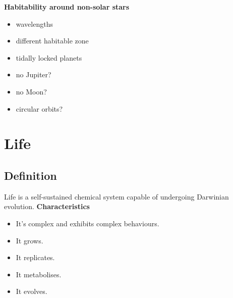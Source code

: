 \documentclass{article}
\theoremstyle{sltheorem}
\begin{document}
\textbf{Habitability around non-solar stars}
\begin{itemize}
	\item wavelengths
	\item different habitable zone
	\item tidally locked planets
	\item no Jupiter?
	\item no Moon?
	\item circular orbits?
\end{itemize}
\section{Life}
\subsection{Definition}
Life is a self-sustained chemical system capable of undergoing Darwinian evolution.
\textbf{Characteristics}
\begin{itemize}
	\item It's complex and exhibits complex behaviours.
	\item It grows.
	\item It replicates.
	\item It metabolises.
	\item It evolves.
\end{itemize}
\end{document}
